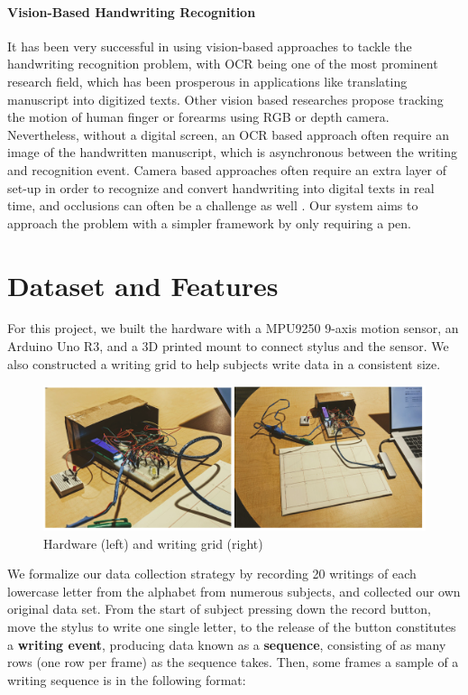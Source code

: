 \documentclass{article}
\begin{document}
\begin{multicols*}{2}
\paragraph{Vision-Based Handwriting Recognition} It has been very successful in using vision-based approaches to tackle the handwriting recognition problem, with OCR \cite{ocr} being one of the most prominent research field, which has been prosperous in applications like translating manuscript into digitized texts. Other vision based researches propose tracking the motion of human finger \cite{finger} or forearms \cite{940024} using RGB or depth camera. Nevertheless, without a digital screen, an OCR based approach often require an image of the handwritten manuscript, which is asynchronous between the writing and recognition event. Camera based approaches often require an extra layer of set-up in order to recognize and convert handwriting into digital texts in real time, and occlusions can often be a challenge as well \cite{Chen2008}. Our system aims to approach the problem with a simpler framework by only requiring a pen.

\section{Dataset and Features}

For this project, we built the hardware with a MPU9250 9-axis motion sensor, an Arduino Uno R3, and a 3D printed mount to connect stylus and the sensor. We also constructed a writing grid to help subjects write data in a consistent size.

\vspace{-4px}
\begin{figure}[H]
    \centering
    \includegraphics[scale=0.16]{hardware.png}
    \caption{Hardware (left) and writing grid (right)}
    \label{fig:hardware}
\end{figure}
\vspace{-8px}

We formalize our data collection strategy by recording 20 writings of each lowercase letter from the alphabet from numerous subjects, and collected our own original data set. From the start of subject pressing down the record button, move the stylus to write one single letter, to the release of the button constitutes a \textbf{writing event}, producing data known as a \textbf{sequence}, consisting of as many rows (one row per frame) as the sequence takes. Then, some frames a sample of a writing sequence is in the following format:


\end{multicols*}
\end{document}

